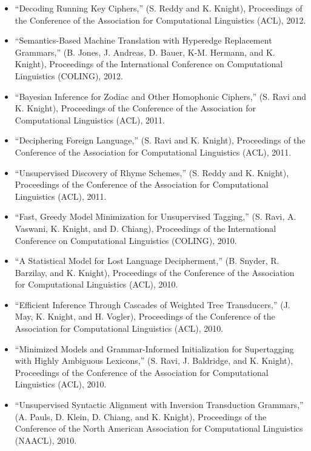 \begin{itemize}
\item ``Decoding Running Key Ciphers,'' (S. Reddy and K. Knight), 
Proceedings of the Conference of the 
Association for Computational Linguistics (ACL), 2012.

\item ``Semantics-Based Machine Translation with Hyperedge Replacement Grammars,'' 
(B. Jones, J. Andreas, D. Bauer, K-M. Hermann, and K. Knight), 
Proceedings of the International Conference on Computational
Linguistics (COLING), 2012.

\item ``Bayesian Inference for Zodiac and Other Homophonic Ciphers,''
(S. Ravi and K. Knight),
Proceedings of the Conference of the 
Association for Computational Linguistics (ACL), 2011.

\item ``Deciphering Foreign Language,''
(S. Ravi and K. Knight),
Proceedings of the Conference of the 
Association for Computational Linguistics (ACL), 2011.

\item ``Unsupervised Discovery of Rhyme Schemes,''
(S. Reddy and K. Knight),
Proceedings of the Conference of the 
Association for Computational Linguistics (ACL), 2011.

\item ``Fast, Greedy Model Minimization for Unsupervised Tagging,''
(S. Ravi, A. Vaswani, K. Knight, and D. Chiang),
Proceedings of the International Conference on Computational
Linguistics (COLING), 2010.

\item ``A Statistical Model for Lost Language Decipherment,'' 
(B. Snyder, R. Barzilay, and K. Knight), 
Proceedings of the Conference of the 
Association for Computational Linguistics (ACL), 
2010.

\item ``Efficient Inference Through Cascades of Weighted
Tree Transducers,'' (J. May, K. Knight, and H. Vogler), 
Proceedings of the Conference of the 
Association for Computational Linguistics (ACL), 
2010.

\item ``Minimized Models and Grammar-Informed Initialization
for Supertagging with Highly Ambiguous Lexicons,''
(S. Ravi, J. Baldridge, and K. Knight), 
Proceedings of the Conference of the 
Association for Computational Linguistics (ACL), 
2010.

\item ``Unsupervised Syntactic Alignment with Inversion Transduction
Grammars,'' (A. Pauls, D. Klein, D. Chiang, and K. Knight),
Proceedings of the Conference of the 
North American Association for Computational Linguistics (NAACL), 
2010.


\end{itemize}
